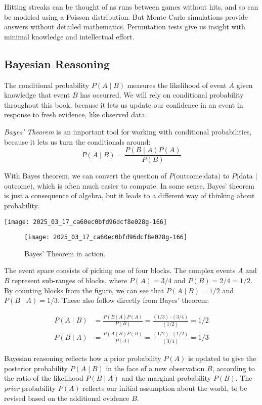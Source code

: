 \documentclass[10pt]{article}
\begin{document}
Hitting streaks can be thought of as runs between games without hits, and so can be modeled using a Poisson distribution. But Monte Carlo simulations provide answers without detailed mathematics. Permutation tests give us insight with minimal knowledge and intellectual effort.

\subsection{Bayesian Reasoning}
The conditional probability $P(A \mid B)$ measures the likelihood of event $A$ given knowledge that event $B$ has occurred. We will rely on conditional probability throughout this book, because it lets us update our confidence in an event in response to fresh evidence, like observed data.

\textit{Bayes' Theorem} is an important tool for working with conditional probabilities, because it lets us turn the conditionals around:
\[
P(A \mid B) = \frac{P(B \mid A) P(A)}{P(B)}
\]

With Bayes theorem, we can convert the question of $P($outcome$\mid$data$)$ to $P($data $\mid$ outcome$)$, which is often much easier to compute. In some sense, Bayes’ theorem is just a consequence of algebra, but it leads to a different way of thinking about probability.

\texttt{[image: 2025\_03\_17\_ca60ec0bfd96dcf8e028g-166]}

\begin{figure}[H]
\centering
\texttt{[image: 2025\_03\_17\_ca60ec0bfd96dcf8e028g-166]}
\caption{Bayes' Theorem in action.}
\end{figure}

The event space consists of picking one of four blocks. The complex events $A$ and $B$ represent sub-ranges of blocks, where $P(A) = 3 / 4$ and $P(B) = 2 / 4 = 1/2$. By counting blocks from the figure, we can see that $P(A \mid B) = 1 / 2$ and $P(B \mid A) = 1 / 3$. These also follow directly from Bayes’ theorem:

\[
\begin{aligned}
P(A \mid B) &= \frac{P(B \mid A) P(A)}{P(B)} = \frac{(1 / 3) \cdot (3 / 4)}{(1 / 2)} = 1 / 2 \\
P(B \mid A) &= \frac{P(A \mid B) P(B)}{P(A)} = \frac{(1 / 2) \cdot (1 / 2)}{(3 / 4)} = 1 / 3
\end{aligned}
\]

Bayesian reasoning reflects how a prior probability $P(A)$ is updated to give the posterior probability $P(A \mid B)$ in the face of a new observation $B$, according to the ratio of the likelihood $P(B \mid A)$ and the marginal probability $P(B)$. The \textit{prior} probability $P(A)$ reflects our initial assumption about the world, to be revised based on the additional evidence $B$.
\end{document}
